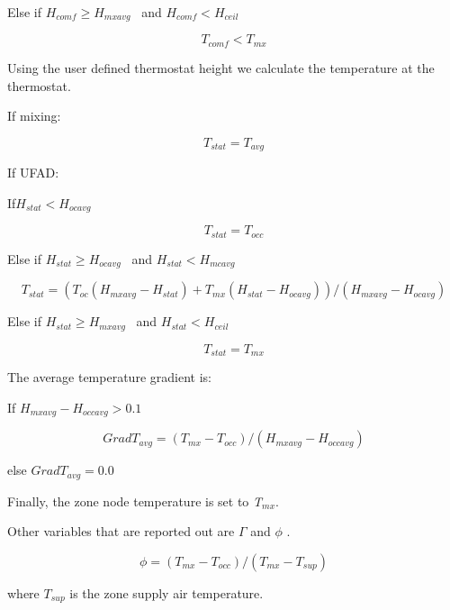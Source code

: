 Else if \({H_{comf}} \ge {H_{mxavg}}\) ~and \({H_{comf}} < {H_{ceil}}\)

\begin{equation}
{T_{comf}} < {T_{mx}}
\end{equation}

Using the user defined thermostat height we calculate the temperature at the thermostat.

If mixing:

\begin{equation}
{T_{stat}} = {T_{avg}}
\end{equation}

If UFAD:

If\({H_{stat}} < {H_{ocavg}}\)

\begin{equation}
{T_{stat}} = {T_{occ}}
\end{equation}

Else if \({H_{stat}} \ge {H_{ocavg}}\) ~and \({H_{stat}} < {H_{mcavg}}\)

\begin{equation}
{T_{stat}} = \left( {{T_{oc}}\left( {{H_{mxavg}} - {H_{stat}}} \right) + {T_{mx}}\left( {{H_{stat}} - {H_{ocavg}}} \right)} \right)/\left( {{H_{mxavg}} - {H_{ocavg}}} \right)
\end{equation}

Else if \({H_{stat}} \ge {H_{mxavg}}\) ~and \({H_{stat}} < {H_{ceil}}\)

\begin{equation}
{T_{stat}} = {T_{mx}}
\end{equation}

The average temperature gradient is:

If \({H_{mxavg}} - {H_{occavg}} > 0.1\)

\begin{equation}
Grad{T_{avg}} = ({T_{mx}} - {T_{occ}})/({H_{mxavg}} - {H_{occavg}})
\end{equation}

else \(Grad{T_{avg}} = 0.0\)

Finally, the zone node temperature is set to \emph{T\(_{mx}\)}.

Other variables that are reported out are \(\Gamma\) and \(\phi\) .

\begin{equation}
\phi  = ({T_{mx}} - {T_{occ}})/({T_{mx}} - {T_{sup}})
\end{equation}

where \({T_{sup}}\) is the zone supply air temperature.

